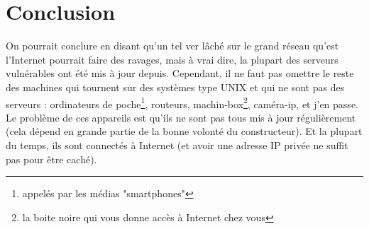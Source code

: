 \documentclass[]{projet-M1}
\begin{document}
\section{Conclusion}
On pourrait conclure en disant qu'un tel ver lâché sur le grand réseau qu'est l'Internet pourrait faire des ravages, mais à vrai dire, la plupart des serveurs vulnérables ont été mis à jour depuis. Cependant, il ne faut pas omettre le reste des machines qui tournent sur des systèmes type \gls{UNIX} et qui ne sont pas des serveurs : ordinateurs de poche\footnote{appelés par les médias "smartphones"}, routeurs, machin-box\footnote{la boite noire qui vous donne accès à Internet chez vous}, caméra-ip, et j'en passe. Le problème de ces appareils est qu'ils ne sont pas tous mis à jour régulièrement (cela dépend en grande partie de la bonne volonté du constructeur). Et la plupart du temps, ils sont connectés à Internet (et avoir une adresse IP privée ne suffit pas pour être caché).


\printglossaries




\end{document}
